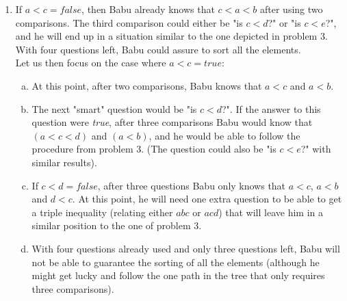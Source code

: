\documentclass{article}
\begin{document}
\begin{enumerate}[1.]
    \item If $a < c = \textit{false}$, then Babu already knows that $c < a < b$ after using two comparisons. The third comparison could either be "is $c < d$?" or "is $c < e$?", and he will end up in a situation similar to the one depicted in problem 3. With four questions left, Babu could assure to sort all the elements.\\
    Let us then focus on the case where $a < c = \textit{true}$:
        \begin{enumerate}[(a)]
            \item At this point, after two comparisons, Babu knows that $a < c$ and $a < b$.
            \item The next "smart" question would be "is $c < d$?". If the answer to this question were \textit{true}, after three comparisons Babu would know that $(a < c < d)$ and $(a < b)$, and he would be able to follow the procedure from problem 3. (The question could also be "is $c < e$?" with similar results).
            \item If $c < d = \textit{false}$, after three questions Babu only knows that $a <c$, $a < b$ and $d < c$. At this point, he will need one extra question to be able to get a triple inequality (relating either $abc$ or $acd$) that will leave him in a similar position to the one of problem 3.
            \item With four questions already used and only three questions left, Babu will not be able to guarantee the sorting of all the elements (although he might get lucky and follow the one path in the tree that only requires three comparisons). 
        \end{enumerate}
        

\end{enumerate}
\end{document}
